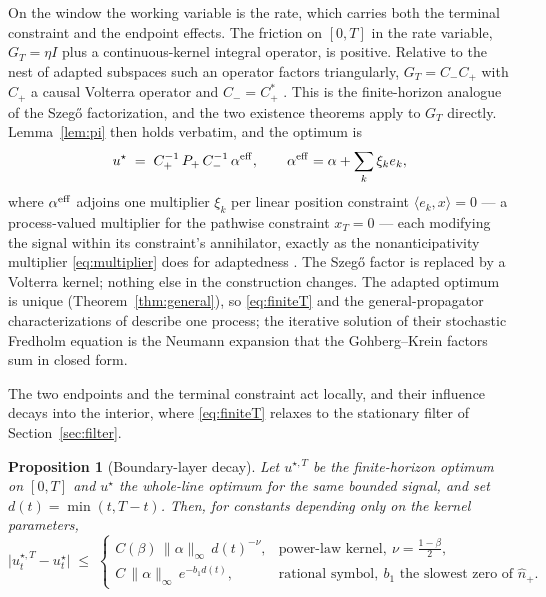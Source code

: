 \documentclass[11pt]{article}
\theoremstyle{plain}
\newtheorem{proposition}{Proposition}
\theoremstyle{definition}
\theoremstyle{remark}
\begin{document}
On the window the working variable is the rate, which carries both the terminal constraint and the endpoint effects. The friction on $[0,T]$ in the rate variable, $G_T=\eta I$ plus a continuous-kernel integral operator, is positive. Relative to the nest of adapted subspaces such an operator factors triangularly, $G_T=C_-C_+$ with $C_+$ a causal Volterra operator and $C_-=C_+^\ast$ \citep{GohbergKrein1970,Arveson1975}. This is the finite-horizon analogue of the Szeg\H{o} factorization, and the two existence theorems apply to $G_T$ directly. Lemma~\ref{lem:pi} then holds verbatim, and the optimum is
\begin{equation}\label{eq:finiteT}
u^\star \;=\; C_+^{-1}\,P_+\,C_-^{-1}\,\alpha^{\rm eff},
\qquad \alpha^{\rm eff}=\alpha+\sum_k\xi_k e_k,
\end{equation}
where $\alpha^{\rm eff}$ adjoins one multiplier $\xi_k$ per linear position constraint $\langle e_k,x\rangle=0$ --- a process-valued multiplier for the pathwise constraint $x_T=0$ --- each modifying the signal within its constraint's annihilator, exactly as the nonanticipativity multiplier \eqref{eq:multiplier} does for adaptedness \citep{AbiJaberDeCarvalhoPham2024}. The Szeg\H{o} factor is replaced by a Volterra kernel; nothing else in the construction changes. The adapted optimum is unique (Theorem~\ref{thm:general}), so \eqref{eq:finiteT} and the general-propagator characterizations of \citet{AbiJaberNeuman2025,AbiJaberNeumanTuschmann2024,AbiJaberDeCarvalhoPham2024} describe one process; the iterative solution of their stochastic Fredholm equation is the Neumann expansion that the Gohberg--Krein factors sum in closed form.

The two endpoints and the terminal constraint act locally, and their influence decays into the interior, where \eqref{eq:finiteT} relaxes to the stationary filter of Section~\ref{sec:filter}.

\begin{proposition}[Boundary-layer decay]\label{prop:boundary}
Let $u^{\star,T}$ be the finite-horizon optimum on $[0,T]$ and $u^\star$ the whole-line optimum for the same bounded signal, and set $d(t)=\min(t,T-t)$. Then, for constants depending only on the kernel parameters,
\begin{equation}\label{eq:bdry-decay}
\bigl|u^{\star,T}_t-u^\star_t\bigr| \;\le\;
\begin{cases}
C(\beta)\,\|\alpha\|_\infty\,d(t)^{-\nu}, & \text{power-law kernel},\ \nu=\tfrac{1-\beta}{2},\\[3pt]
C\,\|\alpha\|_\infty\,e^{-b_1 d(t)}, & \text{rational symbol},\ b_1 \text{ the slowest zero of }\hat n_+ .
\end{cases}
\end{equation}
\end{proposition}
\end{document}
